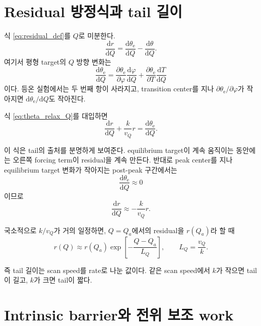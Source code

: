 \documentclass[11pt]{article}
\newcommand{\dd}{\mathrm{d}}
\begin{document}
\section{Residual 방정식과 tail 길이}

식 \eqref{eq:residual_def}를 \(Q\)로 미분한다.
\begin{equation}
\frac{\dd r}{\dd Q}
=
\frac{\dd\theta_{\mathrm e}}{\dd Q}
-
\frac{\dd\theta}{\dd Q}.
\end{equation}
여기서 평형 target의 \(Q\) 방향 변화는
\begin{equation}
\frac{\dd\theta_{\mathrm e}}{\dd Q}
=
\frac{\partial\theta_{\mathrm e}}{\partial\varphi}
\frac{\dd\varphi}{\dd Q}
+
\frac{\partial\theta_{\mathrm e}}{\partial T}
\frac{\dd T}{\dd Q}
\label{eq:theta_eq_chain}
\end{equation}
이다. 등온 실험에서는 두 번째 항이 사라지고, transition center를 지나 \(\partial\theta_{\mathrm e}/\partial\varphi\)가 작아지면 \(\dd\theta_{\mathrm e}/\dd Q\)도 작아진다.

식 \eqref{eq:theta_relax_Q}를 대입하면
\begin{equation}
\boxed{
\frac{\dd r}{\dd Q}
+
\frac{k}{v_Q}r
=
\frac{\dd\theta_{\mathrm e}}{\dd Q}.
}
\label{eq:residual_forced}
\end{equation}

이 식은 tail의 출처를 분명하게 보여준다. equilibrium target이 계속 움직이는 동안에는 오른쪽 forcing term이 residual을 계속 만든다. 반대로 peak center를 지나 equilibrium target 변화가 작아지는 post-peak 구간에서는
\begin{equation}
\frac{\dd\theta_{\mathrm e}}{\dd Q}\approx0
\end{equation}
이므로
\begin{equation}
\frac{\dd r}{\dd Q}\approx-\frac{k}{v_Q}r .
\label{eq:residual_tail_ode}
\end{equation}

국소적으로 \(k/v_Q\)가 거의 일정하면, \(Q=Q_a\)에서의 residual을 \(r(Q_a)\)라 할 때
\begin{equation}
\boxed{
r(Q)
\approx
r(Q_a)
\exp\!\left[-\frac{Q-Q_a}{L_Q}\right],
\qquad
L_Q=\frac{v_Q}{k}.
}
\label{eq:tail_length_basic}
\end{equation}

즉 tail 길이는 scan speed를 rate로 나눈 값이다. 같은 scan speed에서 \(k\)가 작으면 tail이 길고, \(k\)가 크면 tail이 짧다.

\section{Intrinsic barrier와 전위 보조 work}
\end{document}
